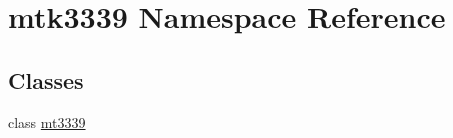 \hypertarget{namespacemtk3339}{}\section{mtk3339 Namespace Reference}
\label{namespacemtk3339}
\subsection*{Classes}
\begin{DoxyCompactItemize}
\item 
class \hyperlink{classmtk3339_1_1mt3339}{mt3339}
\end{DoxyCompactItemize}
